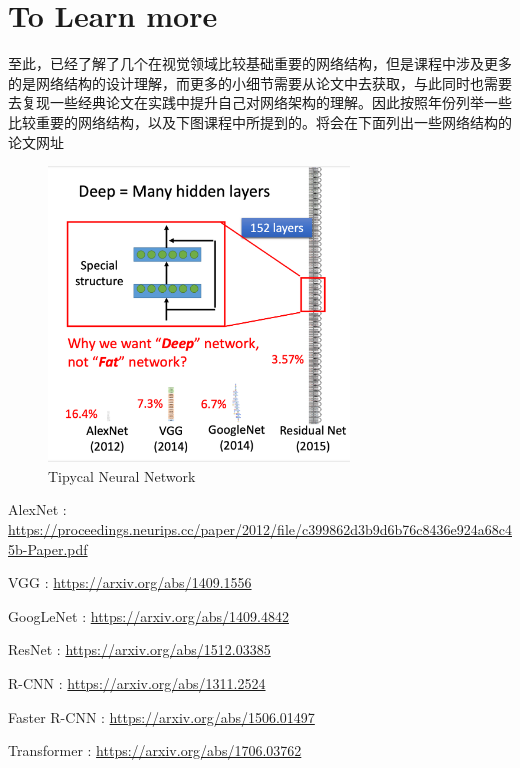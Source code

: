 \documentclass{article}
\begin{document}
\section{To Learn more}
\indent 至此，已经了解了几个在视觉领域比较基础重要的网络结构，但是课程中涉及更多的是网络结构的设计理解，而更多的小细节需要从论文中去获取，与此同时也需要去复现一些经典论文在实践中提升自己对网络架构的理解。因此按照年份列举一些比较重要的网络结构，以及下图课程中所提到的。将会在下面列出一些网络结构的论文网址 \par
\begin{figure}[H]
    \centering
    \includegraphics[width=8cm]{picture/TipycalNeuralNetwork.png}
    \caption{Tipycal Neural Network}
    \label{fig:galxy}
\end{figure}

\noindent AlexNet : \url{https://proceedings.neurips.cc/paper/2012/file/c399862d3b9d6b76c8436e924a68c45b-Paper.pdf} \par
\noindent VGG : \url{https://arxiv.org/abs/1409.1556} \par
\noindent GoogLeNet : \url{https://arxiv.org/abs/1409.4842} \par
\noindent ResNet : \url{https://arxiv.org/abs/1512.03385}\par
\noindent R-CNN : \url{https://arxiv.org/abs/1311.2524}\par
\noindent Faster R-CNN : \url{https://arxiv.org/abs/1506.01497}\par
\noindent Transformer : \url{https://arxiv.org/abs/1706.03762}\par
\end{document}
